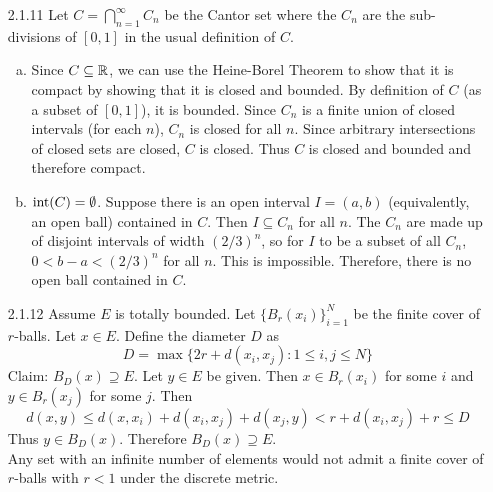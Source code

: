 \documentclass[../../Solutions.tex]{subfiles}
\begin{document}
\begin{itemize}
	\item [2.1.11] Let $C = \bigcap_{n=1}^\infty C_n$ be the Cantor set where the $C_n$ are the sub-divisions of $[0,1]$ in the usual definition of $C$.
	\begin{enumerate}[(a)]
		\item Since $C \subseteq \mathbb{R}$, we can use the Heine-Borel Theorem to show that it is compact by showing that it is closed and bounded.
			By definition of $C$ (as a subset of $[0,1]$), it is bounded.
			Since $C_n$ is a finite union of closed intervals (for each $n$), $C_n$ is closed for all $n$.
			Since arbitrary intersections of closed sets are closed, $C$ is closed.
			Thus $C$ is closed and bounded and therefore compact.
		\item $\text{int}(C)=\emptyset$.
			Suppose there is an open interval $I = (a,b)$ (equivalently, an open ball) contained in $C$.
			Then $I \subseteq C_n$ for all $n$.
			The $C_n$ are made up of disjoint intervals of width $(2/3)^n$, so for $I$ to be a subset of all $C_n$, $0 < b-a < (2/3)^n$ for all $n$.
			This is impossible.
			Therefore, there is no open ball contained in $C$.
	\end{enumerate}
	
	\item [2.1.12] Assume $E$ is totally bounded.
		Let $\{ B_{r}(x_i) \}_{i=1}^N$ be the finite cover of $r$-balls.
		Let $x \in E$.
		Define the diameter $D$ as
		$$ D = \max\{ 2r + d(x_i , x_j) : 1 \leq i,j \leq N \} $$
		Claim: $B_D(x) \supseteq E$.
		Let $y \in E$ be given.
		Then $x \in B_r(x_i)$ for some $i$ and $y \in B_r(x_j)$ for some $j$.
		Then
		$$ d(x,y) \leq d(x,x_i) + d(x_i,x_j) + d(x_j,y) < r + d(x_i,x_j) + r \leq D $$
		Thus $y \in B_D(x)$.
		Therefore $B_D(x) \supseteq E$. \\
		Any set with an infinite number of elements would not admit a finite cover of $r$-balls with $r < 1$ under the discrete metric.
	
	

\end{itemize}
\end{document}
